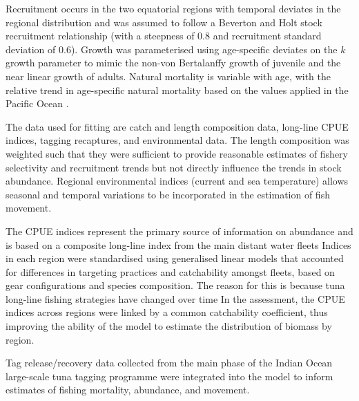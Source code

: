 \documentclass[12pt,halfline,a4paper,nonumbib]{ouparticle}
\begin{document}
Recruitment occurs in the two equatorial regions with temporal deviates in the regional distribution and was assumed to follow a Beverton and Holt stock recruitment relationship (with a steepness of 0.8 and recruitment standard deviation of 0.6).  Growth was parameterised using age-specific deviates on the $k$ growth parameter to mimic the non-von Bertalanffy growth of juvenile and the near linear growth of adults. Natural mortality is variable with age, with the relative trend in age-specific natural mortality based on the values applied in the Pacific Ocean \parencite{maunder2012review}. 


The data used for fitting are catch and length composition data, long-line CPUE indices, tagging recaptures, and environmental data. The length composition was weighted such that they were sufficient to provide reasonable estimates of fishery selectivity and recruitment trends but not directly influence the trends in stock abundance. Regional environmental indices (current and sea temperature) allows seasonal and temporal variations to be incorporated in the estimation of fish movement. 

The CPUE indices represent the primary source of information on abundance and is based on a composite long-line index from the main distant water fleets %
Indices in each region were standardised using generalised linear models that accounted for differences in targeting practices and catchability amongst fleets, based on gear configurations and species composition. The reason for this is because tuna long-line fishing strategies have changed over time %
In the assessment, the CPUE indices across regions were linked by a common catchability coefficient, thus improving the ability of the model to estimate the distribution of biomass by region. %

Tag release/recovery data collected from the main phase of the Indian Ocean large-scale tuna tagging programme %
were integrated into the model to inform estimates of fishing mortality, abundance, and movement. 

\end{document}
